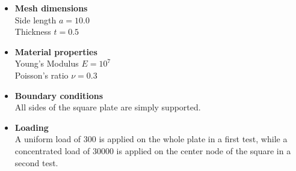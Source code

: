   \begin{itemize}
   \item \textbf{Mesh dimensions}\\
   Side length $a = 10.0$\\
   Thickness $t = 0.5$
    	
   \item \textbf{Material properties}\\
   Young's Modulus $E = 10^7$\\
   Poisson's ratio $\nu = 0.3$
    	
   \item \textbf{Boundary conditions}\\
   All sides of the square plate are simply supported.
    	
   \item \textbf{Loading}\\
   A uniform load of $300$ is applied on the whole plate in a first test, while a concentrated load of $30000$ is applied on the center node of the square in a second test.
  \end{itemize}
    
